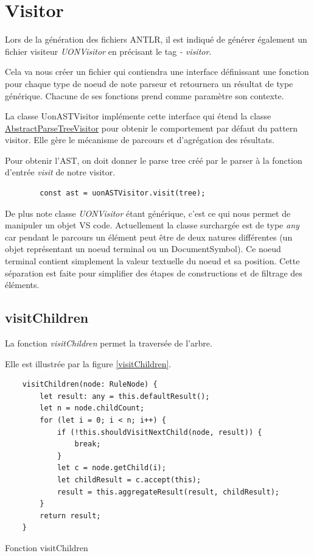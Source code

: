 \documentclass[
    iict, %
    il, %
]{heig-tb}
\begin{document}
\section{Visitor}

Lors de la génération des fichiers ANTLR, il est indiqué de générer également un fichier visiteur \emph{UONVisitor} en précisant le tag \emph{- visitor}.

Cela va nous créer un fichier qui contiendra une interface définissant une fonction pour chaque type de noeud de note parseur et retournera un résultat de type générique.
Chacune de ses fonctions prend comme paramètre son contexte.

La classe UonASTVisitor implémente cette interface qui étend la classe \href{https://www.antlr.org/api/Java/org/antlr/v4/runtime/tree/AbstractParseTreeVisitor.html}{AbstractParseTreeVisitor}
pour obtenir le comportement par défaut du pattern visitor. Elle gère le mécanisme de parcours et d’agrégation des résultats.

Pour obtenir l'AST, on doit donner le parse tree créé par le parser à la fonction d'entrée \emph{visit} de notre visitor.

\begin{listing}[!ht]
    \begin{verbatim}
        const ast = uonASTVisitor.visit(tree);
    \end{verbatim}
\end{listing}

De plus note classe \emph{UONVisitor} étant générique, c'est ce qui nous permet de manipuler un objet VS code.
Actuellement la classe surchargée est de type \emph{any} car pendant le parcours un élément peut être de deux natures différentes (un objet représentant un noeud terminal ou un DocumentSymbol).
Ce noeud terminal contient simplement la valeur textuelle du noeud et sa position.
Cette séparation est faite pour simplifier des étapes de constructions et de filtrage des éléments.

\subsection{visitChildren}
La fonction \emph{visitChildren} permet la traversée de l'arbre.

Elle est illustrée par la figure \ref{visitChildren}.

\begin{listing}[!ht]
    \begin{verbatim}
    visitChildren(node: RuleNode) {
        let result: any = this.defaultResult();
        let n = node.childCount;
        for (let i = 0; i < n; i++) {
            if (!this.shouldVisitNextChild(node, result)) {
                break;
            }
            let c = node.getChild(i);
            let childResult = c.accept(this);
            result = this.aggregateResult(result, childResult);
        }
        return result;
    }
    \end{verbatim}
    \caption{Fonction visitChildren }
    \label{visitChildren}
\end{listing}
\end{document}
